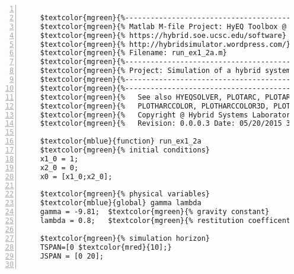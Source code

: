 %  
%  
%  
%  
  
  
\DefineShortVerb[fontfamily=courier,fontseries=m]{\$} 
\DefineShortVerb[fontfamily=courier,fontseries=b]{\#} 
  
\begin{Verbatim}[commandchars=\$\{\},numbers=left,numbersep=2pt] 

    $textcolor{mgreen}{%--------------------------------------------------------------------------} 
    $textcolor{mgreen}{% Matlab M-file Project: HyEQ Toolbox @  Hybrid Systems Laboratory (HSL), } 
    $textcolor{mgreen}{% https://hybrid.soe.ucsc.edu/software} 
    $textcolor{mgreen}{% http://hybridsimulator.wordpress.com/} 
    $textcolor{mgreen}{% Filename: run_ex1_2a.m} 
    $textcolor{mgreen}{%--------------------------------------------------------------------------} 
    $textcolor{mgreen}{% Project: Simulation of a hybrid system (bouncing ball)} 
    $textcolor{mgreen}{%--------------------------------------------------------------------------} 
    $textcolor{mgreen}{%--------------------------------------------------------------------------} 
    $textcolor{mgreen}{%   See also HYEQSOLVER, PLOTARC, PLOTARC3, PLOTFLOWS, PLOTHARC,} 
    $textcolor{mgreen}{%   PLOTHARCCOLOR, PLOTHARCCOLOR3D, PLOTHYBRIDARC, PLOTJUMPS.} 
    $textcolor{mgreen}{%   Copyright @ Hybrid Systems Laboratory (HSL),} 
    $textcolor{mgreen}{%   Revision: 0.0.0.3 Date: 05/20/2015 3:42:00} 
     
    $textcolor{mblue}{function} run_ex1_2a 
    $textcolor{mgreen}{% initial conditions} 
    x1_0 = 1; 
    x2_0 = 0; 
    x0 = [x1_0;x2_0]; 
     
    $textcolor{mgreen}{% physical variables} 
    $textcolor{mblue}{global} gamma lambda 
    gamma = -9.81;  $textcolor{mgreen}{% gravity constant} 
    lambda = 0.8;   $textcolor{mgreen}{% restitution coefficent} 
     
    $textcolor{mgreen}{% simulation horizon} 
    TSPAN=[0 $textcolor{mred}{10];} 
    JSPAN = [0 20]; 
     

\end{Verbatim}
